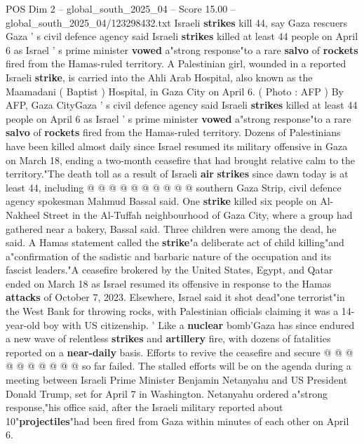 \begin{textsample}{POS Dim 2 – global\_south\_2025\_04 – Score 15.00 – global\_south\_2025\_04/123298432.txt}  \label{ex:f2_pos_344}
Israeli \textbf{strikes} kill 44, say Gaza rescuers Gaza ' s civil defence agency said Israeli \textbf{strikes} killed at least 44 people on April 6 as Israel ' s prime minister \textbf{vowed} a"strong response"to a rare \textbf{salvo} of \textbf{rockets} fired from the Hamas-ruled territory.
A Palestinian girl, wounded in a reported Israeli \textbf{strike}, is carried into the Ahli Arab Hospital, also known as the Maamadani ( Baptist ) Hospital, in Gaza City on April 6. ( Photo : AFP ) By AFP, Gaza CityGaza ' s civil defence agency said Israeli \textbf{strikes} killed at least 44 people on April 6 as Israel ' s prime minister \textbf{vowed} a"strong response"to a rare \textbf{salvo} of \textbf{rockets} fired from the Hamas-ruled territory.
Dozens of Palestinians have been killed almost daily since Israel resumed its military offensive in Gaza on March 18, ending a two-month ceasefire that had brought relative calm to the territory."The death toll as a result of Israeli \textbf{air} \textbf{strikes} since dawn today is at least 44, including @ @ @ @ @ @ @ @ @ @ southern Gaza Strip, civil defence agency spokesman Mahmud Bassal said.
One \textbf{strike} killed six people on Al-Nakheel Street in the Al-Tuffah neighbourhood of Gaza City, where a group had gathered near a bakery, Bassal said.
Three children were among the dead, he said.
A Hamas statement called the \textbf{strike}"a deliberate act of child killing"and a"confirmation of the sadistic and barbaric nature of the occupation and its fascist leaders."A ceasefire brokered by the United States, Egypt, and Qatar ended on March 18 as Israel resumed its offensive in response to the Hamas \textbf{attacks} of October 7, 2023.
Elsewhere, Israel said it shot dead"one terrorist"in the West Bank for throwing rocks, with Palestinian officials claiming it was a 14-year-old boy with US citizenship. ' Like a \textbf{nuclear} bomb'Gaza has since endured a new wave of relentless \textbf{strikes} and \textbf{artillery} fire, with dozens of fatalities reported on a \textbf{near-daily} basis.
Efforts to revive the ceasefire and secure @ @ @ @ @ @ @ @ @ @ so far failed.
The stalled efforts will be on the agenda during a meeting between Israeli Prime Minister Benjamin Netanyahu and US President Donald Trump, set for April 7 in Washington.
Netanyahu ordered a"strong response,"his office said, after the Israeli military reported about 10"\textbf{projectiles}"had been fired from Gaza within minutes of each other on April 6.

\end{textsample}
